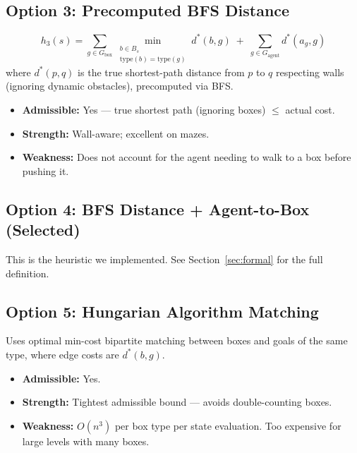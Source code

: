 \documentclass[11pt, a4paper]{article}
\begin{document}
\subsection{Option 3: Precomputed BFS Distance}

\begin{definitionbox}
\[
    h_3(s) = \sum_{g \in G_{\text{box}}} \min_{\substack{b \in B_s \\ \text{type}(b)=\text{type}(g)}} d^*(b, g)
    \;+\; \sum_{g \in G_{\text{agent}}} d^*(a_g, g)
\]
where $d^*(p,q)$ is the true shortest-path distance from $p$ to $q$ respecting walls (ignoring dynamic obstacles), precomputed via BFS.
\end{definitionbox}

\begin{itemize}
    \item \textbf{Admissible:} Yes --- true shortest path (ignoring boxes) $\leq$ actual cost.
    \item \textbf{Strength:} Wall-aware; excellent on mazes.
    \item \textbf{Weakness:} Does not account for the agent needing to walk to a box before pushing it.
\end{itemize}

\subsection{Option 4: BFS Distance + Agent-to-Box (Selected)}

This is the heuristic we implemented. See Section~\ref{sec:formal} for the full definition.

\subsection{Option 5: Hungarian Algorithm Matching}

\begin{definitionbox}
Uses optimal min-cost bipartite matching between boxes and goals of the same type, where edge costs are $d^*(b,g)$.
\end{definitionbox}

\begin{itemize}
    \item \textbf{Admissible:} Yes.
    \item \textbf{Strength:} Tightest admissible bound --- avoids double-counting boxes.
    \item \textbf{Weakness:} $O(n^3)$ per box type per state evaluation. Too expensive for large levels with many boxes.
\end{itemize}
\end{document}
